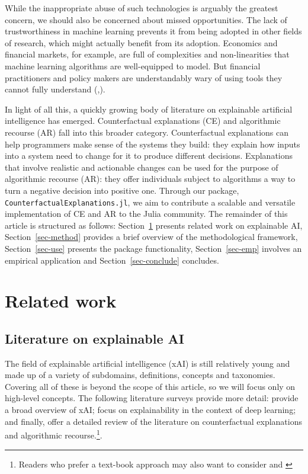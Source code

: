 \documentclass[
  letterpaper,
  DIV=11,
  numbers=noendperiod]{scrartcl}
\begin{document}
While the inappropriate abuse of such technologies is arguably the
greatest concern, we should also be concerned about missed
opportunities. The lack of trustworthiness in machine learning prevents
it from being adopted in other fields of research, which might actually
benefit from its adoption. Economics and financial markets, for example,
are full of complexities and non-linearities that machine learning
algorithms are well-equipped to model. But financial practitioners and
policy makers are understandably wary of using tools they cannot fully
understand (\cite{oecd2021artificial},\cite{hansen2020virtue}).

In light of all this, a quickly growing body of literature on
explainable artificial intelligence has emerged. Counterfactual
explanations (CE) and algorithmic recourse (AR) fall into this broader
category. Counterfactual explanations can help programmers make sense of
the systems they build: they explain how inputs into a system need to
change for it to produce different decisions. Explanations that involve
realistic and actionable changes can be used for the purpose of
algorithmic recourse (AR): they offer individuals subject to algorithms
a way to turn a negative decision into positive one. Through our
package, \texttt{CounterfactualExplanations.jl}, we aim to contribute a
scalable and versatile implementation of CE and AR to the Julia
community. The remainder of this article is structured as follows:
Section~\ref{sec-related} presents related work on explainable AI,
Section~\ref{sec-method} provides a brief overview of the methodological
framework, Section~\ref{sec-use} presents the package functionality,
Section~\ref{sec-emp} involves an empirical application and
Section~\ref{sec-conclude} concludes.

\hypertarget{sec-related}{%
\section{Related work}\label{sec-related}}

\hypertarget{literature-on-explainable-ai}{%
\subsection{Literature on explainable
AI}\label{literature-on-explainable-ai}}

The field of explainable artificial intelligence (xAI) is still
relatively young and made up of a variety of subdomains, definitions,
concepts and taxonomies. Covering all of these is beyond the scope of
this article, so we will focus only on high-level concepts. The
following literature surveys provide more detail:
\cite{arrieta2020explainable} provide a broad overview of xAI;
\cite{fan2020interpretability} focus on explainability in the context of
deep learning; and finally, \cite{karimi2020survey} offer a detailed
review of the literature on counterfactual explanations and algorithmic
recourse.\footnote{Readers who prefer a text-book approach may also want
  to consider \cite{molnar2020interpretable} and
  \cite{varshney2022trustworthy}}.
\end{document}
